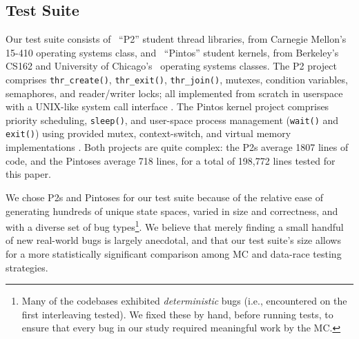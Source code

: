 \subsection{Test Suite}
\label{sec:testsuite}
Our test suite consists of \numthrlibs~``P2'' student thread libraries, from Carnegie Mellon's 15-410 operating systems class,
and \numpintoses~``Pintos'' student kernels, from Berkeley's CS162 and University of Chicago's
~operating systems classes.
%
The P2 project comprises \texttt{thr\_create()}, \texttt{thr\_exit()}, \texttt{thr\_join()}, mutexes, condition variables, semaphores, and reader/writer locks;
all implemented from scratch in userspace with a UNIX-like system call interface \cite{kspec,thrlib}.
%
The Pintos kernel project
comprises priority scheduling, \texttt{sleep()}, and user-space process management (\texttt{wait()} and \texttt{exit()})
using provided mutex, context-switch, and virtual memory implementations
\cite{pintos}.
Both projects are quite complex:
the P2s average 1807 lines of code, %
and the Pintoses average 718 lines, for a total of 198,772 lines tested for this paper.

We chose P2s and Pintoses for our test suite because of the relative ease of generating hundreds of unique state spaces,
varied in size and correctness, and with a diverse set of bug types\footnote{
Many of the codebases exhibited {\em deterministic} bugs (i.e., encountered on the first interleaving tested).
We fixed these by hand, before running tests, to ensure that every bug in our study required meaningful work by the MC.}.
We believe that merely finding a small handful of new real-world bugs is largely anecdotal,
and that our test suite's size allows for a more statistically significant comparison among MC and data-race testing strategies.

